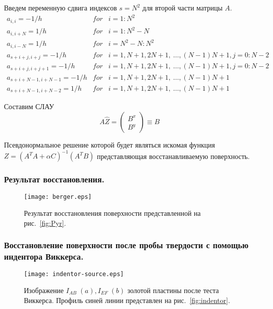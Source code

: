 \documentclass{beamer}
\begin{document}
\begin{frame}[allowframebreaks]
    Введем переменную сдвига индексов $s = N^2$ для второй части матрицы $A$.
    \begin{equation}
        \begin{array}{lll}
            a_{i,i} = -1/h            & for & i = 1:N^2                                       \\
            a_{i,i+N} = 1/h           & for & i = 1:N^2 - N                                   \\
            a_{i,i-N} = 1/h           & for & i = N^2 - N:N^2                                 \\
            a_{s+i+j, i+j} = -1/h     & for & i = 1, N+1, 2N+1,~\dots, (N-1)N + 1, j = 0:N-2  \\
            a_{s+i+j, i+j+1} = -1/h   & for & i = 1, N+1, 2N+1,~\dots, (N-1)N + 1, j = 0:N-2  \\
            a_{s+i+N-1, i+N-1} = -1/h & for & i = 1, N+1, 2N+1,~\dots, (N-1)N + 1             \\
            a_{s+i+N-1, i+N-2} = 1/h  & for & i = 1, N+1, 2N+1,~\dots, (N-1)N + 1
        \end{array}
    \end{equation}

    Составим СЛАУ
    \begin{equation}
        \label{eq:SLAE}
        A \hat{Z} = \left(
            \begin{array}{l}
                B^x \\
                B^y
            \end{array}
        \right)
        \equiv{} B
    \end{equation}

    Псевдонормальное решение которой будет являться искомая функция $Z = {( A^T A + \alpha C)}^{-1} ( A^T B) $ представляющая восстанавливаемую поверхность.
\end{frame}



\begin{frame}
    \frametitle{Результат восстановления.}
    \begin{figure}
        \texttt{[image: berger.eps]}
        \caption{Результат восстановления поверхности представленной на рис.~\ref{fig:Pyr}.}
        {\label{fig:berger}}%
    \end{figure}
\end{frame}

\begin{frame}
    \frametitle{Восстановление поверхности после пробы твердости с помощью индентора Виккерса.}
    \begin{figure}
        \texttt{[image: indentor-source.eps]}
        \caption{Изображение $I_{AB} \; (a), I_{EF} \; (b)$ золотой пластины после теста Виккерса. Профиль синей линии представлен на рис.~\ref{fig:indentor}.}
        {\label{fig:indentor-source}}%
    \end{figure}
\end{frame}
\end{document}
